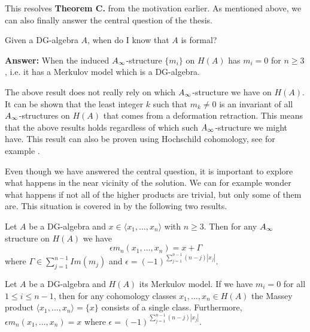 This resolves \textbf{Theorem C.} from the motivation earlier. As mentioned above, we can also finally answer the central question of the thesis. 
\begin{central}
Given a DG-algebra $A$, when do I know that $A$ is formal?
\end{central}

\textbf{Answer:} When the induced $A_{\infty}$-structure $\{m_i\}$ on $H(A)$ has $m_i=0$ for $n\geq 3$, i.e. it has a Merkulov model which is a DG-algebra.  

The above result does not really rely on which $A_{\infty}$-structure we have on $H(A)$. It can be shown that the least integer $k$ such that $m_k \neq 0$ is an invariant of all $A_{\infty}$-structures on $H(A)$ that comes from a deformation retraction. This means that the above results holds regardless of which such $A_{\infty}$-structure we might have. This result can also be proven using Hochschild cohomology, see for example \cite[Theorem 3.3.]{berglund}.

Even though we have answered the central question, it is important to explore what happens in the near vicinity of the solution. We can for example wonder what happens if not all of the higher products are trivial, but only some of them are. This situation is covered in \cite{detection} by the following two results.

\begin{theorem}
Let $A$ be a DG-algebra and $x\in \langle x_1, \ldots, x_n\rangle$ with $n\geq 3$. Then for any $A_{\infty}$ structure on $H(A)$ we have 
\begin{equation*}
    \epsilon m_n(x_1, \ldots, x_n) = x+\Gamma 
\end{equation*}
where $\Gamma \in \sum_{j=1}^{n-1}Im(m_j)$ and $\epsilon = (-1)^{\sum_{j=1}^{n-1} (n-j)|x_j|}$. 
\end{theorem}
\label{thm:infty_massey_recovers_massey}

\begin{corollary}
Let $A$ be a DG-algebra and $H(A)$ its Merkulov model. If we have $m_i=0$ for all $1\leq i\leq n-1$, then for any cohomology classes $x_1, \ldots, x_n \in H(A)$ the Massey product $\langle x_1, \ldots, x_n\rangle = \{ x\}$ consists of a single class. Furthermore, $\epsilon m_n(x_1, \ldots, x_n)=x$ where $\epsilon = (-1)^{\sum_{j=1}^{n-1} (n-j)|x_j|}$.
\label{cor:uniquely_defined}
\end{corollary}



